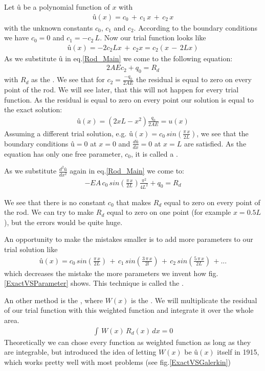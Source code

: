 Let $û$ be a polynomial function of $x$ with 
\begin{align}
û(x)=c_0\,+\,c_1\,x\,+\,c_2\,x \nonumber
\end{align}
with the unknown constants $c_0$, $c_1$ and $c_2$. According to the boundary conditions we have $c_0=0$ and $c_1=-c_2\,L$. Now our trial function looks like
\begin{align}
û(x)=-2c_2Lx\,+\,c_2x=c_2(x\,-\,2Lx) \nonumber
\end{align}
As we substitute $û$ in eq.\ref{Rod_Main} we come to the following equation:
\begin{align}
2AEc_2+q_0=R_d \nonumber
\end{align}
with $R_d$ as the . We see that for $c_2=\frac{-q_0}{2AE}$ the residual is equal to zero on every point of the rod. We will see later, that this will not happen for every trial function. As the residual is equal to zero on every point our solution is equal to the exact solution:
\begin{align}
û(x)=(2xL-x^2)\frac{q_0}{2AE}=u(x) \nonumber
\end{align}
Assuming a different trial solution, e.g. $û(x)=c_0\,sin(\frac{\pi\,x}{2L})$, we see that the boundary conditions $û=0$ at $x=0$ and $\frac{dû}{dx}=0$ at $x=L$ are satisfied. As the equation has only one free parameter, $c_0$, it is called a .

As we substitute $\frac{d^2û}{dx^2}$ again in eq.\ref{Rod_Main} we come to:
\begin{align}
-EA\, c_0\,sin\left(\frac{\pi\,x}{2L}\right)\frac{\pi^2}{4L^2}+q_0=R_d \nonumber
\end{align}

We see that there is no constant $c_0$ that makes $R_d$ equal to zero on every point of the rod. We can try to make $R_d$ equal to zero on one point (for example $x=0.5L$), but the errors would be quite huge. 

An opportunity to make the mistakes smaller is to add more parameters to our trial solution like
\begin{align}
û(x)=c_0\,sin\left(\frac{\pi\,x}{2L}\right)\,+\,c_1\,sin\left(\frac{3\,\pi\,x}{2l}\right)\,+\,c_2\,sin\left(\frac{5\,\pi\,x}{2L}\right)\,+... 
\end{align}
which decreases the mistake the more parameters we invent how fig.\ref{ExactVSParameter} shows. This technique is called the .

\bigskip
An other method is the , where $W(x)$ is the . We will multiplicate the residual of our trial function with this weighted function and integrate it over the whole area. 
\begin{align}
\int\,W(x)\,R_d(x)\,dx=0 \nonumber
\end{align}
Theoretically we can chose every function as weighted function as long as they are integrable, but  introduced the idea of letting $W(x)$ be $û(x)$ itself in 1915, which works pretty well with most problems (see fig.\ref{ExactVSGalerkin})

